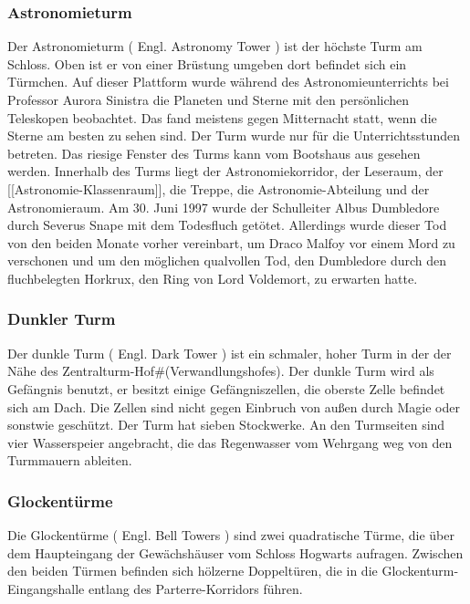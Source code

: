 \documentclass[a4paper, 10pt]{article}
\begin{document}
\subsubsection*{\large Astronomieturm}
Der Astronomieturm (  Engl.  Astronomy Tower ) ist der höchste Turm am Schloss. Oben ist er von einer Brüstung umgeben dort befindet sich ein Türmchen. Auf dieser Plattform wurde während des Astronomieunterrichts bei Professor Aurora Sinistra die Planeten und Sterne mit den persönlichen Teleskopen beobachtet. Das fand meistens gegen Mitternacht statt, wenn die Sterne am besten zu sehen sind. Der Turm wurde nur für die Unterrichtsstunden betreten. Das riesige Fenster des Turms kann vom Bootshaus aus gesehen werden.
\vspace{10pt}
\newline
{}  
Innerhalb des Turms liegt der Astronomiekorridor, der Leseraum, der [[Astronomie-Klassenraum]], die Treppe, die Astronomie-Abteilung und der Astronomieraum. Am 30. Juni 1997 wurde der Schulleiter Albus Dumbledore durch Severus Snape mit dem Todesfluch getötet. Allerdings wurde dieser Tod von den beiden Monate vorher vereinbart, um Draco Malfoy vor einem Mord zu verschonen und um den möglichen qualvollen Tod, den Dumbledore durch den fluchbelegten Horkrux, den Ring von Lord Voldemort, zu erwarten hatte.
\subsubsection*{\large Dunkler Turm}
Der dunkle Turm (  Engl.  Dark Tower ) ist ein schmaler, hoher Turm in der der Nähe des Zentralturm-Hof#(Verwandlungshofes). Der dunkle Turm wird als Gefängnis benutzt, er besitzt einige Gefängniszellen, die oberste Zelle befindet sich am Dach. Die Zellen sind nicht gegen Einbruch von außen durch Magie oder sonstwie geschützt. Der Turm hat sieben Stockwerke. An den Turmseiten sind vier Wasserspeier angebracht, die das Regenwasser vom Wehrgang weg von den Turmmauern ableiten.
\subsubsection*{\large Glockentürme}
Die Glockentürme (  Engl.  Bell Towers ) sind zwei quadratische Türme, die über dem Haupteingang der Gewächshäuser vom Schloss Hogwarts aufragen. Zwischen den beiden Türmen befinden sich hölzerne Doppeltüren, die in die Glockenturm-Eingangshalle entlang des Parterre-Korridors führen.
\end{document}
